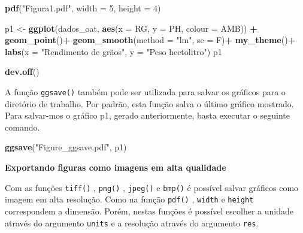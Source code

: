 \documentclass[
]{book}
\newenvironment{Shaded}{\begin{snugshade}}{\end{snugshade}}
\newcommand{\DataTypeTok}[1]{\textcolor[rgb]{0.13,0.29,0.53}{#1}}
\newcommand{\DecValTok}[1]{\textcolor[rgb]{0.00,0.00,0.81}{#1}}
\newcommand{\KeywordTok}[1]{\textcolor[rgb]{0.13,0.29,0.53}{\textbf{#1}}}
\newcommand{\NormalTok}[1]{#1}
\newcommand{\OperatorTok}[1]{\textcolor[rgb]{0.81,0.36,0.00}{\textbf{#1}}}
\newcommand{\StringTok}[1]{\textcolor[rgb]{0.31,0.60,0.02}{#1}}
\begin{document}
\begin{Shaded}
\begin{Highlighting}[]
\KeywordTok{pdf}\NormalTok{(}\StringTok{"Figura1.pdf"}\NormalTok{, }\DataTypeTok{width =} \DecValTok{5}\NormalTok{, }\DataTypeTok{height =} \DecValTok{4}\NormalTok{)}

\NormalTok{p1 <-}\StringTok{ }\KeywordTok{ggplot}\NormalTok{(dados_oat, }\KeywordTok{aes}\NormalTok{(}\DataTypeTok{x =}\NormalTok{ RG, }\DataTypeTok{y =}\NormalTok{ PH, }\DataTypeTok{colour =}\NormalTok{ AMB)) }\OperatorTok{+}
\StringTok{      }\KeywordTok{geom_point}\NormalTok{()}\OperatorTok{+}
\StringTok{      }\KeywordTok{geom_smooth}\NormalTok{(}\DataTypeTok{method =} \StringTok{"lm"}\NormalTok{, }\DataTypeTok{se =}\NormalTok{ F)}\OperatorTok{+}
\StringTok{      }\KeywordTok{my_theme}\NormalTok{()}\OperatorTok{+}
\StringTok{      }\KeywordTok{labs}\NormalTok{(}\DataTypeTok{x =} \StringTok{"Rendimento de grãos"}\NormalTok{, }\DataTypeTok{y =} \StringTok{"Peso hectolitro"}\NormalTok{)}
\NormalTok{p1}

\KeywordTok{dev.off}\NormalTok{()}
\end{Highlighting}
\end{Shaded}

A função \texttt{ggsave()}  também pode ser utilizada para salvar os gráficos para o diretório de trabalho. Por padrão, esta função salva o último gráfico mostrado. Para salvar-mos o gráfico p1, gerado anteriormente, basta executar o seguinte comando.

\begin{Shaded}
\begin{Highlighting}[]
\KeywordTok{ggsave}\NormalTok{(}\StringTok{"Figure_ggsave.pdf"}\NormalTok{, p1)}
\end{Highlighting}
\end{Shaded}

\textbf{Exportando figuras como imagens em alta qualidade}

Com as funções \texttt{tiff()} , \texttt{png()} , \texttt{jpeg()}  e \texttt{bmp()}  é possível salvar gráficos como imagem em alta resolução. Como na função \texttt{pdf()} , \texttt{width} e \texttt{height} correspondem a dimensão. Porém, nestas funções é possível escolher a unidade através do argumento \texttt{units} e a resolução através do argumento \texttt{res}.
\end{document}
